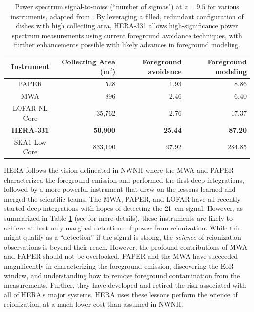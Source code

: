 \documentclass[preprint]{aastex}
\begin{document}
\begin{table}
\centering
\begin{tabular}{c||r||r|r} 
Instrument & Collecting Area (m$^2$) & Foreground avoidance & Foreground modeling \\
\hline
PAPER & 528 & 1.93 & 8.86 \\
MWA & 896 & 2.46 & 6.40 \\
LOFAR NL Core & 35,762 & 2.76 & 17.37 \\
\textbf{HERA-331} & \textbf{50,900} & \textbf{25.44} & \textbf{87.20} \\
SKA1 Low Core & 833,190 & 97.92 & 284.85 \\
\end{tabular}
\caption{\small
Power spectrum signal-to-noise (``number of sigmas") at $z=9.5$ for various instruments, adapted from \citet{pober_et_al2014}.  By leveraging a filled, redundant configuration of dishes with high collecting area, HERA-331 allows high-significance power spectrum measurements using current foreground avoidance techniques, with further enhancements possible with likely advances in foreground modeling.}
\label{tab:signif}
\end{table}


HERA follows the vision delineated in NWNH where the MWA and PAPER
characterized the foreground emission and performed the first deep
integrations, followed by a more powerful instrument that drew on the lessons
learned and merged the scientific teams. The MWA, PAPER, and LOFAR have all
recently started deep integrations with hopes of detecting the 21~cm
signal.
However, as summarized in Table \ref{tab:signif} (see \citealt{pober_et_al2014} for more details),
these instruments are likely to achieve
at best only marginal detections of power from reionization.
While this might qualify as a ``detection'' if the signal is strong, the
\emph{science} of reionization observations is beyond their reach. 
However, the profound contributions of MWA and PAPER should not be overlooked. PAPER and the MWA have succeeded magnificently in characterizing the foreground emission, discovering the EoR window, and understanding how to remove foreground contamination from the measurements. Further, they have developed and retired the risk associated with all of HERA's major systems. 
HERA uses these lessons perform the science of reionization, at a much lower cost than assumed in NWNH.
\end{document}
